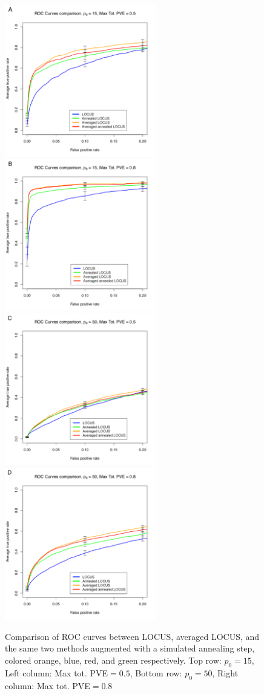 \documentclass[a4paper, 11pt]{report}
\numberwithin{equation}{chapter}
\begin{document}
\begin{figure}[h!]
\centering
\includegraphics[width=2.6in, bb=0 0 500 500]{images/ROC_Comp_p0_15_var_0_5.pdf}
\includegraphics[width=2.6in, bb=0 0 500 500]{images/ROC_Comp_p0_15_var_0_8.pdf}
\includegraphics[width=2.6in, bb=0 0 500 500]{images/ROC_Comp_p0_50_var_0_5.pdf}
\includegraphics[width=2.6in, bb=0 0 500 500]{images/ROC_Comp_p0_50_var_0_8.pdf}
\caption{\label{fig:ROCComp}Comparison of ROC curves between LOCUS, averaged LOCUS, and the same two methods augmented with a simulated annealing step, colored orange, blue, red, and green respectively. Top row: $p_0 = 15$, Left column: Max tot. PVE$ = 0.5$,
Bottom row: $p_0 = 50$, Right column: Max tot. PVE$ = 0.8$}
\end{figure}
\end{document}
